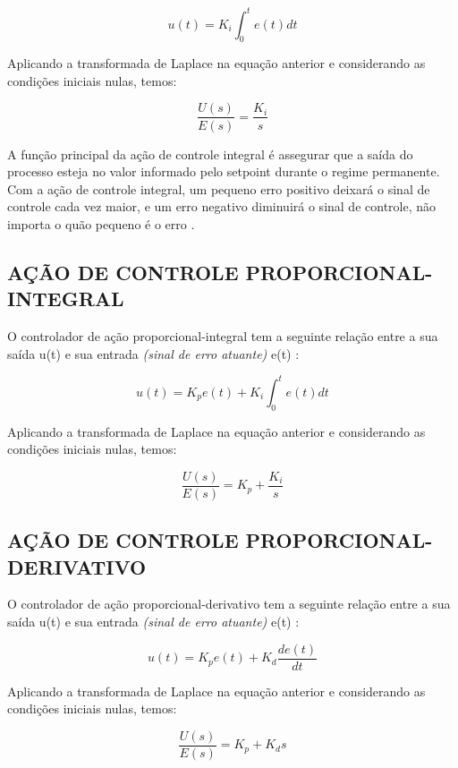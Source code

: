 \documentclass[12pt,oneside,a4paper, chapter=TITLE, section = TITLE, english, brazil]{abntex2}
\begin{document}
$$u(t) = K_{i} \int^{t}_0 e(t)dt$$

Aplicando a transformada de Laplace na equação anterior e considerando as condições iniciais nulas, temos:

\begin{equation}
\frac{U(s)}{E(s)} = \frac{K_{i}}{s} \label{eq:g_s_cont_integ}
\end{equation}

A função principal da ação de controle integral é assegurar que a saída do processo esteja no valor informado pelo setpoint durante o regime permanente. Com a ação de controle integral, um pequeno erro positivo deixará o sinal de controle cada vez maior, e um erro negativo diminuirá o sinal de controle, não importa o quão pequeno é o erro \cite{astrom}.

\subsection{AÇÃO DE CONTROLE PROPORCIONAL-INTEGRAL}

O controlador de ação proporcional-integral tem a seguinte relação entre a sua saída u(t) e sua entrada \textit{(sinal de erro atuante)} e(t) \cite{ogata}:

$$u(t) = K_{p}e(t) + K_{i} \int^{t}_0 e(t)dt$$

Aplicando a transformada de Laplace na equação anterior e considerando as condições iniciais nulas, temos:

\begin{equation}
\frac{U(s)}{E(s)} = K_{p} + \frac{K_{i}}{s} \label{eq:g_s_cont_prop_integ}
\end{equation}

\subsection{AÇÃO DE CONTROLE PROPORCIONAL-DERIVATIVO}

O controlador de ação proporcional-derivativo tem a seguinte relação entre a sua saída u(t) e sua entrada \textit{(sinal de erro atuante)} e(t) \cite{ogata}:

$$u(t) = K_{p}e(t) + K_{d}\frac{de(t)}{dt}$$

Aplicando a transformada de Laplace na equação anterior e considerando as condições iniciais nulas, temos:

\begin{equation}
\frac{U(s)}{E(s)} = K_{p} + K_{d}s \label{eq:g_s_cont_prop_deriv}
\end{equation}
\end{document}
